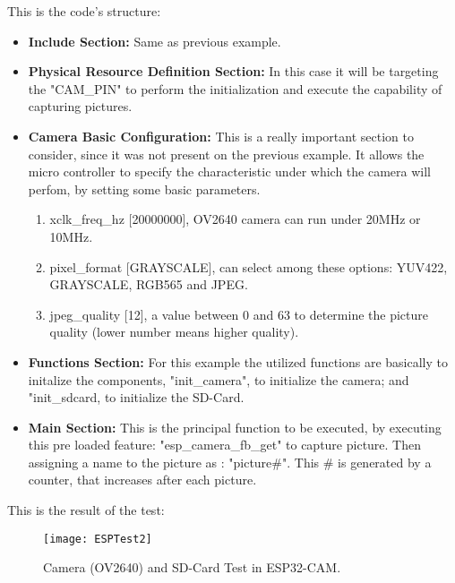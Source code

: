 This is the code's structure:
\begin{itemize}
	\item\textbf{Include Section: }Same as previous example.
	\item\textbf{Physical Resource Definition Section: }In this case it will be targeting the "CAM\_PIN" to perform the initialization and execute the capability of capturing pictures.
	\item\textbf{Camera Basic Configuration: } This is a really important section to consider, since it was not present on the previous example. It allows the micro controller to specify the characteristic under which the camera will perfom, by setting some basic parameters.
		\begin{enumerate}
			\item xclk\_freq\_hz [20000000], OV2640 camera can run under 20MHz or 10MHz.
			\item pixel\_format [GRAYSCALE], can select among these options: YUV422, GRAYSCALE, RGB565 and JPEG.
			\item jpeg\_quality [12], a value between 0 and 63 to determine the picture quality (lower number means higher quality).
		\end{enumerate}
	\item\textbf{Functions Section: }For this example the utilized functions are basically to initalize the components, "init\_camera", to initialize the camera; and "init\_sdcard, to initialize the SD-Card.
	\item\textbf{Main Section: }This is the principal function to be executed, by executing this pre loaded feature: "esp\_camera\_fb\_get" to capture picture. Then assigning a name to the picture as : "picture\#". This \# is generated by a counter, that increases after each picture. \\
\end{itemize}
	
This is the result of the test: 
\begin{figure}  [H]
	\begin{center}
		\texttt{[image: ESPTest2]}
		\caption{Camera (OV2640) and SD-Card Test in ESP32-CAM.} 
		\label{fig:Camera (OV2640) and SD-Card Test in ESP32-CAM.}
	\end{center}
\end{figure}	



